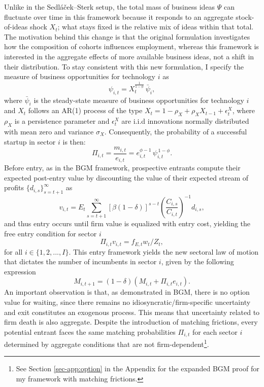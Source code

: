 \documentclass[a4paper,12pt]{article} %
\numberwithin{equation}{section} %
\numberwithin{figure}{section}
\numberwithin{table}{section}
\begin{document}
Unlike in the Sedláček–Sterk setup, the total mass of business ideas $\Psi$ can fluctuate over time in 
this framework because it responds to an aggregate stock-of-ideas shock $X_t$; what stays fixed 
is the relative mix of ideas within that total. The motivation behind this change is that
the original formulation investigates how the composition of cohorts influences employment, whereas this framework is interested in the aggregate 
effects of more available business ideas, not a shift in their distribution. To stay consistent with this new formulation, I specify the measure 
of business opportunities for technology \(i\) as 
\begin{equation}
  \psi_{i,t} =X_t^{\frac{1}{1-\phi}}\,\bar{\psi}_i, \label{eq:psilaw}
\end{equation}
where \(\bar{\psi}_i\) is the steady-state measure of business opportunities for technology \(i\) and $X_t$ follows an AR(1) process of the type 
$X_t = 1 - \rho_X + \rho_X X_{t-1} + \epsilon^X_t$, where $\rho_X$ is a persistence parameter and $\epsilon^X_t$ are i.i.d innovations 
normally distributed with mean zero and variance $\sigma_X$. Consequently, the probability of a successful startup in sector $i$ is then:
\begin{equation}
  \Pi_{i,t} = \frac{m_{i,t}}{e_{i,t}} = e_{i,t}^{\phi-1}\,\psi_{i,t}^{\,1-\phi}. \label{eq:probability}
\end{equation}
Before entry, as in the BGM framework, prospective entrants compute their expected post-entry value by discounting the value of their expected stream
of profits $\{d_{i,s}\}_{s=t+1}^\infty$ as
\begin{equation}
  v_{i,t} = E_t \sum_{s = t+1}^{\infty} \left[ \beta (1 - \delta) \right]^{s - t} \left( \frac{C_{i,s}}{C_{i,t}} \right)^{-1} d_{i,s}, \label{eq:value}
\end{equation}
and thus entry occurs until firm value is equalized with entry cost, yielding the free entry condition for sector $i$ 
\begin{equation}
  \Pi_{i,t}v_{i,t} = f_{E,t}w_t/Z_t , \label{eq:freeentry}
\end{equation}
for all $i \in \{1,2,..., I\}$. This entry framework yields the new sectoral law of motion that dictates the number of incumbents in sector $i$, 
given by the following expression
\begin{equation}
  M_{i,t+1} = (1-\delta)(M_{i,t} + \Pi_{i,t}e_{i,t}). \label{eq:entrants}
\end{equation}
An important observation is that, as demonstrated in BGM, there is no option value for waiting, since there remains no 
idiosyncratic/firm-specific uncertainty and exit constitutes an exogenous process. This means that uncertainty related to firm death is also aggregate. 
Despite the introduction of matching frictions, every potential entrant faces the same matching probabilities $\Pi_{i,t}$ for each sector $i$ 
determined by aggregate conditions that are not firm-dependent\footnote{See Section \ref{sec-app:option} in the Appendix for the expanded BGM 
proof for my framework with matching frictions.}.
\end{document}
